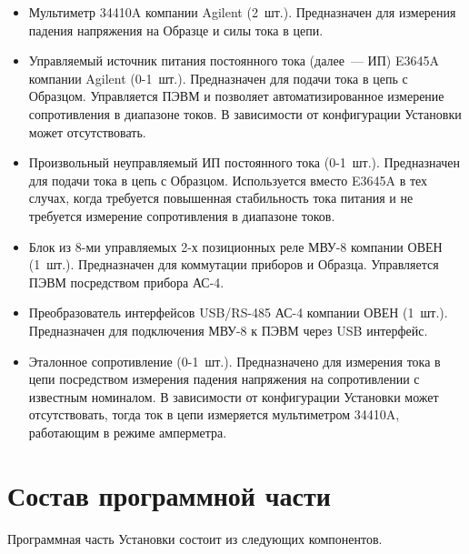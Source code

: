 \documentclass[12pt, a4paper, twocolumn]{book}
\begin{document}
\begin{itemize}

\item Мультиметр 34410A компании Agilent (2~шт.). Предназначен для измерения падения напряжения на Образце и силы тока в цепи.

\item Управляемый источник питания постоянного тока (далее~--- ИП) E3645A компании Agilent (0-1~шт.). Предназначен для подачи тока в цепь с Образцом. Управляется ПЭВМ и позволяет автоматизированное измерение сопротивления в диапазоне токов. В зависимости от конфигурации Установки может отсутствовать.

\item Произвольный неуправляемый ИП постоянного тока (0-1~шт.). Предназначен для подачи тока в цепь с Образцом. Используется вместо E3645A в тех случах, когда требуется повышенная стабильность тока питания и не требуется измерение сопротивления в диапазоне токов.

\item Блок из 8-ми управляемых 2-х позиционных реле МВУ-8 компании ОВЕН (1~шт.). Предназначен для коммутации приборов и Образца. Управляется ПЭВМ посредством прибора АС-4.

\item Преобразователь интерфейсов USB/RS-485 АС-4 компании ОВЕН (1~шт.). Предназначен для подключения МВУ-8 к ПЭВМ через USB интерфейс.

\item Эталонное сопротивление (0-1~шт.). Предназначено для измерения тока в цепи посредством измерения падения напряжения на сопротивлении с известным номиналом. В зависимости от конфигурации Установки может отсутствовать, тогда ток в цепи измеряется мультиметром 34410A, работающим в режиме амперметра.

\end{itemize}

\section{Состав программной части}

Программная часть Установки состоит из следующих компонентов.
\end{document}
